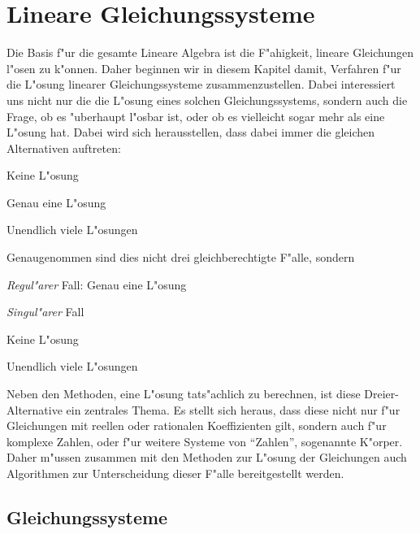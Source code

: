 %
%
%
\chapter{Lineare Gleichungssysteme\label{chapter-lingl}}
Die Basis f"ur die gesamte Lineare Algebra ist die F"ahigkeit, lineare
Gleichungen l"osen zu k"onnen.
Daher beginnen wir in diesem Kapitel
damit, Verfahren f"ur die L"osung linearer Gleichungssysteme
zusammenzustellen.
Dabei interessiert uns nicht nur die die L"osung
eines solchen Gleichungssystems, sondern auch die Frage, ob es
"uberhaupt l"osbar ist, oder ob es vielleicht sogar mehr als eine
L"osung hat.
Dabei wird sich herausstellen, dass dabei immer die
gleichen Alternativen auftreten:
\begin{compactenum}
\item Keine L"osung
\item Genau eine L"osung
\item Unendlich viele L"osungen
\end{compactenum}
Genaugenommen sind dies nicht drei gleichberechtigte F"alle,
sondern
\begin{compactenum}
\item {\em Regul"arer} Fall: Genau eine L"osung
\item {\em Singul"arer} Fall
\begin{compactenum}
\item Keine L"osung
\item Unendlich viele L"osungen
\end{compactenum}
\end{compactenum}
Neben den Methoden, eine L"osung tats"achlich zu berechnen, ist
diese Dreier-Alternative ein zentrales Thema.
Es stellt sich heraus,
dass diese nicht nur f"ur Gleichungen mit reellen oder rationalen
Koeffizienten gilt, sondern auch f"ur komplexe Zahlen, oder
f"ur weitere Systeme von ``Zahlen'', sogenannte K"orper.
Daher
m"ussen zusammen mit den Methoden zur L"osung der Gleichungen
auch Algorithmen zur Unterscheidung dieser F"alle bereitgestellt
werden.

\section{Gleichungssysteme}
